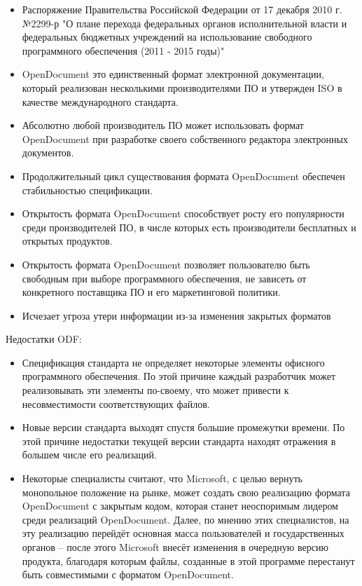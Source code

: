 \begin{itemize}
  \item Распоряжение Правительства Российской Федерации от 17 декабря 2010 г. №2299-р "О плане перехода федеральных органов исполнительной власти и федеральных бюджетных учреждений на использование свободного программного обеспечения (2011 - 2015 годы)"
  \item OpenDocument это единственный формат электронной документации, который реализован несколькими производителями ПО и утвержден ISO в качестве международного стандарта.
  \item Абсолютно любой производитель ПО может использовать формат OpenDocument при разработке своего собственного редактора
электронных документов.
  \item Продолжительный цикл существования формата OpenDocument обеспечен стабильностью спецификации.
  \item Открытость формата OpenDocument способствует росту его популярности среди производителей ПО, в числе которых есть производители бесплатных и открытых продуктов. 
  \item Открытость формата OpenDocument позволяет пользователю быть свободным при выборе программного обеспечения, не зависеть от конкретного поставщика ПО и его маркетинговой политики.
  \item Исчезает угроза утери информации из-за изменения закрытых форматов
\end{itemize}
Недостатки ODF:
\begin{itemize}
  \item Спецификация  стандарта не определяет некоторые  элементы офисного программного обеспечения. По этой причине каждый разработчик может реализовывать эти элементы по-своему, что может привести к несовместимости соответствующих файлов.
  \item Новые версии стандарта выходят спустя большие промежутки времени. По этой причине недостатки текущей версии стандарта находят отражения в большем числе его реализаций.   
  \item Некоторые специалисты считают, что Microsoft, с целью вернуть монопольное положение на рынке, может создать свою реализацию формата OpenDocument с закрытым кодом,  которая  станет неоспоримым лидером среди реализаций OpenDocument. Далее, по мнению этих специалистов,  на эту реализацию перейдёт основная масса пользователей и государственных органов – после этого Microsoft внесёт изменения в очередную версию продукта, благодаря которым файлы, созданные в этой программе перестанут быть совместимыми с форматом OpenDocument.
\end{itemize}

